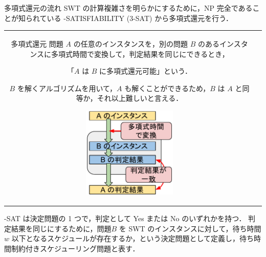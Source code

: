 \documentclass[dvipdfmx]{beamer}
\begin{document}
    \begin{frame}{多項式還元の流れ}
      SWT の計算複雑さを明らかにするために，NP 完全であることが知られている {-SATISFIABILITY (3-SAT)} から\alert{多項式還元}を行う．
      \begin{tabular}{cc}
        \begin{minipage}[]{0.6\hsize}
          \begin{block}{多項式還元}
            問題 $A$ の任意のインスタンスを，別の問題 $B$ のあるインスタンスに多項式時間で変換して，判定結果を同じにできるとき，
            \begin{center}
              「$A$ は $B$ に多項式還元可能」という．
            \end{center}
            $B$ を解くアルゴリズムを用いて，$A$ も解くことができるため，$B$ は $A$ と同等か，それ以上難しいと言える．
          \end{block}
        \end{minipage}
        \begin{minipage}[]{0.4\hsize}
          \begin{figure}[h]
            \centering
            \includegraphics[width=4.5cm]{figure/reduction.pdf}
          \end{figure}
        \end{minipage}
        \vspace{5mm}
      \end{tabular}
      \vspace{-5mm}
      \begin{block}{}
        {-SAT} は決定問題の 1 つで，判定として Yes または No のいずれかを持つ．
        判定結果を同じにするために，問題$B$ を SWT のインスタンスに対して，待ち時間 $w$ 以下となるスケジュールが存在するか，という決定問題として定義し，\alert{待ち時間制約付きスケジューリング問題}と表す．
      \end{block}
    \end{frame}
\end{document}
